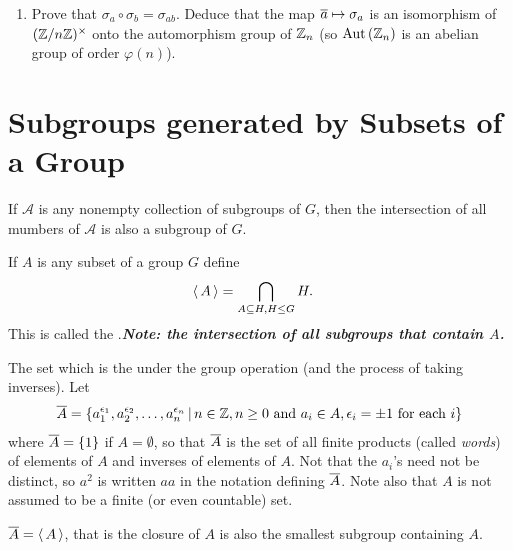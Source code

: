 \documentclass[10pt,a4paper]{report}
\begin{document}
\begin{enumerate}
\begin{enumerate}
		\item Prove that $\sigma_a\circ\sigma_b=\sigma_{ab}$.  Deduce that the map $\overline{a}\mapsto \sigma_a$ is an isomorphism of $(\mathbb{Z}/n\mathbb{Z})^\times$ onto the automorphism group of $\mathbb{Z}_n$ (so $\text{Aut}\,(\mathbb{Z}_n)$ is an abelian group of order $\varphi(n)$).
	\end{enumerate}
\end{enumerate}

\section{Subgroups generated by Subsets of a Group}

\begin{prop}If $\mathcal{A}$ is any nonempty collection of subgroups of $G$, then the intersection of all mumbers of $\mathcal{A}$ is also a subgroup of $G$.
\end{prop}

\begin{definition}  If $A$ is any subset of a group $G$ define
\begin{align*}
	\left \langle\, A \,\right \rangle &= \bigcap_{A\subseteq H, H\le G} H.
\end{align*}This is called the .\textbf{\textit{Note: the intersection of all subgroups that contain $A$.}}
\end{definition}

\begin{definition}[Closure of $A$]The set which is the  under the group operation (and the process of taking inverses).  Let
\begin{align*}
	\overline{A} = \{a_1^{\epsilon_1},a_2^{\epsilon_2},\dots,a_n^{\epsilon_n}\,|\, n \in \mathbb{Z}, n \ge 0 \text{ and } a_i \in A, \epsilon_i = \pm 1 \text{ for each } i \}
\end{align*}where $\overline{A} = \{1\}$ if $A = \emptyset$, so that $\overline{A}$ is the set of all finite products (called \textit{words}) of elements of $A$ and inverses of elements of $A$.  Not that the $a_i$'s need not be distinct, so $a^2$ is written $aa$ in the notation defining $\overline{A}$.  Note also that $A$ is not assumed to be a finite (or even countable) set.
\end{definition}

\begin{prop}$\overline{A} = \left \langle\, A \,\right \rangle$, that is the closure of $A$ is also the smallest subgroup containing $A$.
\end{prop}
\end{document}
